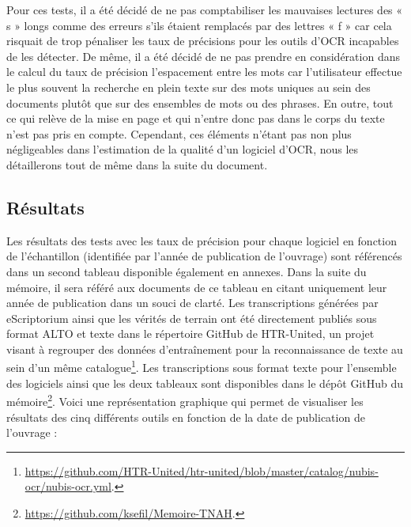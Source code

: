 \documentclass[a4paper,12pt,twoside]{book}
\begin{document}
	Pour ces tests, il a été décidé de ne pas comptabiliser les mauvaises
	lectures des « s » longs comme des erreurs s'ils étaient remplacés par
	des lettres « f » car cela risquait de trop pénaliser les taux de
	précisions pour les outils d'OCR incapables de les détecter. De même, il
	a été décidé de ne pas prendre en considération dans le calcul du taux
	de précision l'espacement entre les mots car l'utilisateur effectue le
	plus souvent la recherche en plein texte sur des mots uniques au sein
	des documents plutôt que sur des ensembles de mots ou des phrases. En
	outre, tout ce qui relève de la mise en page et qui n'entre donc pas
	dans le corps du texte n'est pas pris en compte. Cependant, ces éléments
	n'étant pas non plus négligeables dans l'estimation de la qualité d'un
	logiciel d'OCR, nous les détaillerons tout de même dans la suite du
	document.
	
	\subsection{Résultats}
	
	Les résultats des tests avec les taux de précision pour chaque logiciel
	en fonction de l'échantillon (identifiée par l'année de publication de
	l'ouvrage) sont référencés dans un second tableau disponible également
	en annexes. Dans la suite du mémoire, il sera référé aux documents de ce
	tableau en citant uniquement leur année de publication dans un souci de
	clarté. Les transcriptions générées par eScriptorium ainsi que les
	vérités de terrain ont été directement publiés sous format ALTO et texte
	dans le répertoire GitHub de HTR-United, un projet visant à regrouper
	des données d'entraînement pour la reconnaissance de
	texte au sein d'un même catalogue\footnote{\url{https://github.com/HTR-United/htr-united/blob/master/catalog/nubis-ocr/nubis-ocr.yml}.}.
	Les transcriptions sous format texte pour l'ensemble des logiciels ainsi
	que les deux tableaux sont disponibles dans le dépôt GitHub du
	mémoire\footnote{\url{https://github.com/ksefil/Memoire-TNAH}.}.
	Voici une représentation graphique qui permet de visualiser les
	résultats des cinq différents outils en fonction de la date de
	publication de l'ouvrage : \\
	
\end{document}
